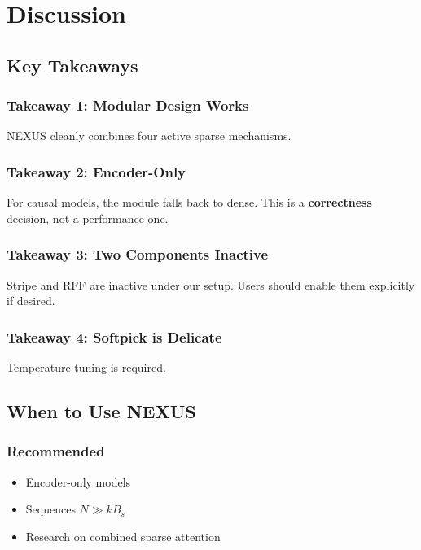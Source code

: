 \section{Discussion}

\subsection{Key Takeaways}

\subsubsection{Takeaway 1: Modular Design Works}

NEXUS cleanly combines four active sparse mechanisms.

\subsubsection{Takeaway 2: Encoder-Only}

For causal models, the module falls back to dense. This is a \textbf{correctness} 
decision, not a performance one.

\subsubsection{Takeaway 3: Two Components Inactive}

Stripe and RFF are inactive under our setup. Users should enable them 
explicitly if desired.

\subsubsection{Takeaway 4: Softpick is Delicate}

Temperature tuning is required.

\subsection{When to Use NEXUS}

\subsubsection{Recommended}
\begin{itemize}
\item Encoder-only models
\item Sequences $N \gg k B_s$
\item Research on combined sparse attention

\end{itemize}
